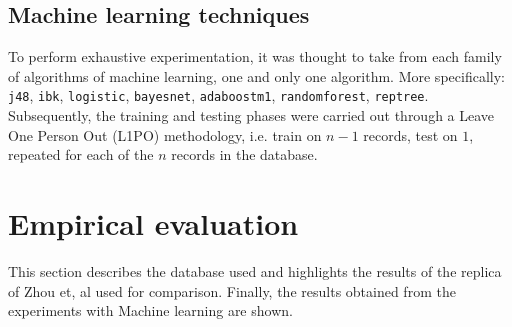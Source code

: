 \subsection{Machine learning techniques}
\label{sec:ml_techniques}
To perform exhaustive experimentation, it was thought to take from each family of algorithms of machine learning, one and only one algorithm. More specifically: \verb|j48|, \verb|ibk|, \verb|logistic|, \verb|bayesnet|, \verb|adaboostm1|, \verb|randomforest|, \verb|reptree|. Subsequently, the training and testing phases were carried out through a Leave One Person Out (L1PO) methodology, i.e. train on $n-1$ records, test on $1$, repeated for each of the $n$ records in the database.
 
\section{Empirical evaluation}
This section describes the database used and highlights the results of the replica of Zhou et, al used for comparison. Finally, the results obtained from the experiments with Machine learning are shown.

